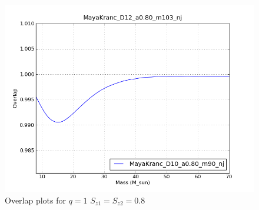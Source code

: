 \begin{figure}
  \includegraphics[width=\linewidth]{figures/ninja2/figure_1_0d8_01.png}
  \caption[Overlap plots for $q=1$ $S_{z1} = S_{z2} = 0.8$]{
  \label{f:figure_1_0d8}
Overlap plots for $q=1$ $S_{z1} = S_{z2} = 0.8$}
\end{figure}%


